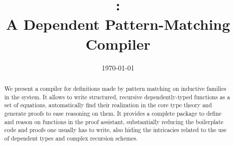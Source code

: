\documentclass[a4paper]{llncs}
\author{\theauthor}
\date{\today}
\institute{\myaffiliation
  \\\email{\mymail}}
\title{\Equations:\\
  A Dependent Pattern-Matching Compiler}
\begin{document}
\maketitle

\begin{abstract}
  We present a compiler for definitions made by pattern matching on
  inductive families in the \Coq system. It allows to write structured,
  recursive dependently-typed functions as a set of equations,
  automatically find their realization in the core type theory and
  generate proofs to ease reasoning on them.
  It provides a complete package to define 
  and reason on functions in the proof assistant, substantially
  reducing the boilerplate code and proofs one usually has to write, 
  also hiding the intricacies related to the use of dependent types and
  complex recursion schemes.
\end{abstract}







\end{document}
